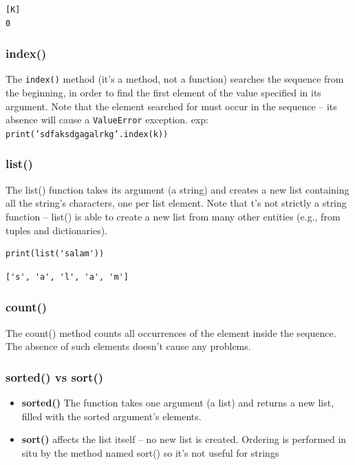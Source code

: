 \documentclass[11pt]{article}
\begin{document}
\begin{verbatim}
[K]
0
\end{verbatim}
\subsubsection{index()}
\label{sec:orgba8b7d6}
The \texttt{index()} method (it’s a method, not a function) searches the
sequence from the beginning, in order to find the first element of the
value specified in its argument. Note that the element searched for must
occur in the sequence – its absence will cause a \texttt{ValueError} exception.
exp: \texttt{print('sdfaksdgagalrkg'.index(k))}
\subsubsection{list()}
\label{sec:orgcb68aae}
The list() function takes its argument (a string) and creates a new
list containing all the string’s characters, one per list
element. Note that t’s not strictly a string function – list() is able
to create a new list from many other entities (e.g., from tuples and
dictionaries).

\begin{verbatim}
print(list('salam'))
\end{verbatim}

\begin{verbatim}
['s', 'a', 'l', 'a', 'm']
\end{verbatim}
\subsubsection{count()}
\label{sec:org5c21d30}
The count() method counts all occurrences of the element inside the
sequence. The absence of such elements doesn’t cause any problems.
\subsubsection{sorted() vs sort()}
\label{sec:orgd88bd5b}
\begin{itemize}
\item \textbf{sorted()} The function takes one argument (a list) and returns a new list,
filled with the sorted argument’s elements.
\item \textbf{sort()} affects the list itself – no new list is created. Ordering
is performed in situ by the method named sort() so it's not useful for strings
\end{itemize}
\end{document}
